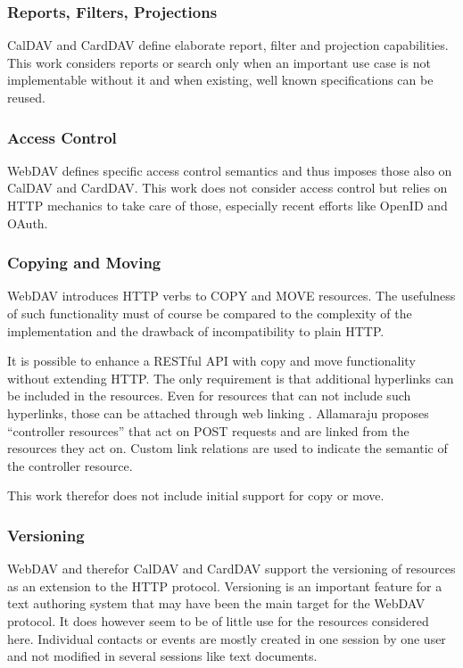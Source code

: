 \documentclass[11pt,a4paper,headsepline,twoside]{scrartcl}		%
\begin{document}
\subsubsection{Reports, Filters, Projections}

CalDAV and CardDAV define elaborate report, filter and projection
capabilities. This work considers reports or search only when an important use
case is not implementable without it and when existing, well known
specifications can be reused.

\subsubsection{Access Control}
WebDAV defines specific access control semantics and thus imposes those also on
CalDAV and CardDAV. This work does not consider access control but relies on
HTTP mechanics to take care of those, especially recent efforts like OpenID and
OAuth. %

\subsubsection{Copying and Moving}
WebDAV introduces HTTP verbs to COPY and MOVE resources. The usefulness of such
functionality must of course be compared to the complexity of the implementation
and the drawback of incompatibility to plain HTTP.

It is possible to enhance a RESTful API with copy and move functionality without
extending HTTP. The only requirement is that additional hyperlinks can be
included in the resources. Even for resources that can not include such
hyperlinks, those can be attached through web linking \cite{RFC5988}
. Allamaraju \cite[Ch. 11]{Allamaraju_2010} proposes ``controller resources''
that act on POST requests and are linked from the resources they act on. Custom
link relations are used to indicate the semantic of the controller resource.

This work therefor does not include initial support for copy or move.

\subsubsection{Versioning}

WebDAV and therefor CalDAV and CardDAV support the versioning of resources as an
extension to the HTTP protocol. Versioning is an important feature for a text
authoring system that may have been the main target for the WebDAV protocol.  It
does however seem to be of little use for the resources considered
here. Individual contacts or events are mostly created in one session by one
user and not modified in several sessions like text documents.
\end{document}
